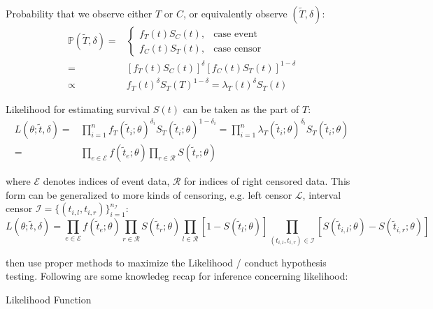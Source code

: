 Probability that we observe either $ T $ or $ C $, or equivalently observe $ (\tilde{T},\delta ) $:
\begin{align}
    \mathbb{P}(\tilde{T},\delta)=&\begin{cases}
        f_T(t)S_C(t),&\text{case event}\\
        f_C(t)S_T(t),&\text{case censor}
    \end{cases}\\
    =&\left[ f_T(t)S_C(t) \right]^\delta \left[ f_C(t)S_T(t) \right]^{1-\delta }\\
    \propto & f_T(t)^{\delta }S_T(T)^{1-\delta }=\lambda _T(t)^\delta S_T(t)
\end{align}

Likelihood for estimating survival $ S(t) $ can be taken as the part of $ T $:
\begin{align}
    L(\theta ;\tilde{t},\delta )=&\prod_{i=1}^n f_T(\tilde{t}_i;\theta )^{\delta_i }S_T(\tilde{t}_i;\theta )^{1-\delta_i }=\prod_{i=1}^n\lambda _T(\tilde{t}_i;\theta )^{\delta _i}S_T(\tilde{t}_i;\theta )\\
    =&\prod_{e\in \mathcal{E}}f(\tilde{t}_e;\theta )\prod_{r\in\mathcal{R}}S(\tilde{t}_r;\theta )
\end{align}
    
where $ \mathcal{E} $ denotes indices of event data, $ \mathcal{R} $ for indices of right censored data. This form can be generalized to more kinds of censoring, e.g. left censor $ \mathcal{L} $, interval censor $ \mathcal{I}=\{(t_{i,l},t_{i,r})\}_{i=1}^{n_\mathcal{I}} $:
\begin{equation}
     L(\theta ;\tilde{t},\delta )=\prod_{e\in \mathcal{E}}f(\tilde{t}_e;\theta )\prod_{r\in\mathcal{R}}S(\tilde{t}_r;\theta ) \prod_{l\in\mathcal{R}}\left[1-S(\tilde{t}_l;\theta )\right] \prod_{(t_{i,l},t_{i,r})\in \mathcal{I}}\left[ S(\tilde{t}_{i,l};\theta )-S(\tilde{t}_{i,r};\theta ) \right]
\end{equation}

then use proper methods to maximize the Likelihood / conduct hypothesis testing. Following are some knowledeg recap for inference concerning likelihood:

\begin{point}
    Likelihood Function
\end{point}

